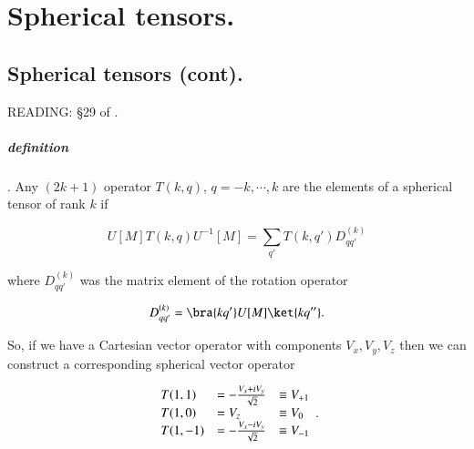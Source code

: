 %
%

\chapter{Spherical tensors.}
\label{chap:qmTwoL20}
{}
\date{Nov 21, 2011}

\beginArtWithToc

%
%
\section{Spherical tensors (cont).}

READING: \S 29 of \cite{desai2009quantum}.

\paragraph{definition}.  Any $(2k + 1)$ operator $T(k, q)$, $q = -k, \cdots, k$ are the elements of a spherical tensor of rank $k$ if

\begin{equation}\label{eqn:qmTwoL20:10}
U[M] T(k, q) U^{-1}[M]
= \sum_{q'} T(k, q') D^{(k)}_{q q'}
\end{equation}

where $D^{(k)}_{q q'}$ was the matrix element of the rotation operator

\begin{equation}\label{eqn:qmTwoL20:20}
D^{(k)}_{q q'} = \bra{k q'} U[M] \ket{k q''}.
\end{equation}

So, if we have a Cartesian vector operator with components $V_x, V_y, V_z$ then we can construct a corresponding spherical vector operator

\begin{equation}\label{eqn:qmTwoL20:30}
\begin{array}{l l l}
T(1, 1) &= - \frac{V_x + i V_y}{\sqrt{2}} &\equiv V_{+1} \\
T(1, 0) &= V_z &\equiv V_0 \\
T(1, -1) &= - \frac{V_x - i V_y}{\sqrt{2}} &\equiv V_{-1}
\end{array}.
\end{equation}

